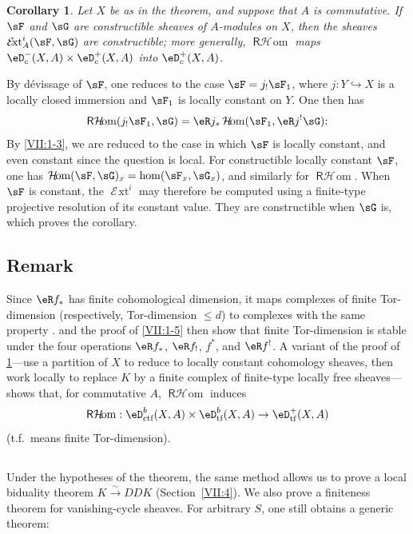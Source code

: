 \documentclass[12pt,oneside,english]{smfbook}
\DeclareMathOperator{\Ext}{\mathcal{E}\!xt} %
\DeclareMathOperator{\Hom}{\mathcal{H}\!om} %
\DeclareMathOperator{\rHom}{\mathsf{R}\mathcal{H}\!om}
\newcommand{\iso}{\xrightarrow\sim}
\newtheorem{corollary_}[subsection]{Corollary}
\begin{document}
\begin{corollary_}\label{VII:1-6}
Let $X$ be as in the theorem, and suppose that $A$ is commutative. If $\sF$ and $\sG$ are constructible sheaves of $A$-modules on $X$, then the sheaves $\Ext_A^i(\sF,\sG)$ are constructible; more generally, $\rHom$ maps $\eD_c^-(X,A)\times\eD_c^+(X,A)$ into $\eD_c^+(X,A)$.
\end{corollary_}

By dévissage of $\sF$, one reduces to the case $\sF=j_!\sF_1$, where $j:Y\hookrightarrow X$ is a locally closed immersion and $\sF_1$ is locally constant on $Y$. One then has
\[
  \rHom(j_! \sF_1,\sG) = \eR j_\ast \Hom(\sF_1,\eR j^! \sG) \text{:}
\]
By \ref{VII:1-3}, we are reduced to the case in which $\sF$ is locally constant, and even constant since the question is local. For constructible locally constant $\sF$, one has $\Hom(\sF,\sG)_x=\hom(\sF_x,\sG_x)$, and similarly for $\rHom$. When $\sF$ is constant, the $\Ext^i$ may therefore be computed using a finite-type projective resolution of its constant value. They are constructible when $\sG$ is, which proves the corollary.

\subsection{Remark}\label{VII:1-7}

Since $\eR f_\ast$ has finite cohomological dimension, it maps complexes of finite Tor-dimension (respectively, Tor-dimension $\leqslant d$) to complexes with the same property \cite[XVII, 5.2.11]{sga4}. \cite[XVII, 5.2.10]{sga4} and the proof of \ref{VII:1-5} then show that finite Tor-dimension is stable under the four operations $\eR f_\ast$, $\eR f_!$, $f^\ast$, and $\eR f^!$. A variant of the proof of \ref{VII:1-6}---use a partition of $X$ to reduce to locally constant cohomology sheaves, then work locally to replace $K$ by a finite complex of finite-type locally free sheaves---shows that, for commutative $A$, $\rHom$ induces
\[
  \rHom:\eD_\text{ctf}^b(X,A)\times \eD_\text{tf}^b(X,A) \to \eD_\text{tf}^+(X,A)
\]
(t.f.\ means finite Tor-dimension).

\subsection{}\label{VII:1-8}

Under the hypotheses of the theorem, the same method allows us to prove a local biduality theorem $K\iso DDK$ (Section~\ref{VII:4}). We also prove a finiteness theorem for vanishing-cycle sheaves. For arbitrary $S$, one still obtains a generic theorem:
\end{document}
